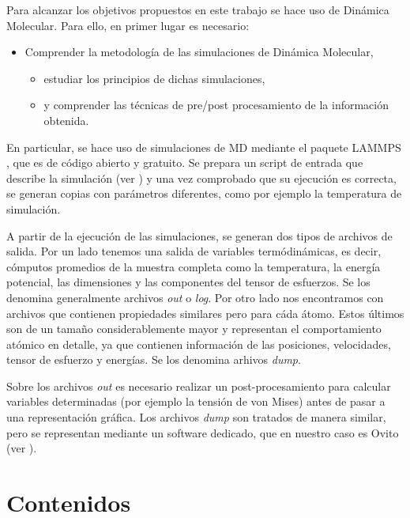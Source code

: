 Para alcanzar los objetivos propuestos en este trabajo se hace uso de Dinámica Molecular. Para ello, en primer lugar es necesario:

\begin{itemize}
 \item Comprender la metodología de las simulaciones de Dinámica Molecular,
 \begin{itemize}
  \item estudiar los principios de dichas simulaciones,
  \item y comprender las técnicas de pre/post procesamiento de la información obtenida.
 \end{itemize}
\end{itemize}

En particular, se hace uso de simulaciones de MD mediante el paquete LAMMPS \citep{plimpton95}, que es de código abierto y gratuito. Se prepara un script de entrada que describe la simulación (ver ) y una vez comprobado que su ejecución es correcta, se generan copias con parámetros diferentes, como por ejemplo la temperatura de simulación.

A partir de la ejecución de las simulaciones, se generan dos tipos de archivos de salida. Por un lado tenemos una salida de variables termódinámicas, es decir, cómputos promedios de la muestra completa como la temperatura, la energía potencial, las dimensiones y las componentes del tensor de esfuerzos. Se los denomina generalmente archivos \textit{out} o \textit{log}. Por otro lado nos encontramos con archivos que contienen propiedades similares pero para cáda átomo. Estos últimos son de un tamaño considerablemente mayor y representan el comportamiento atómico en detalle, ya que contienen información de las posiciones, velocidades, tensor de esfuerzo y energías. Se los denomina arhivos \textit{dump}.

Sobre los archivos \textit{out} es necesario realizar un post-procesamiento para calcular variables determinadas (por ejemplo la tensión de von Mises) antes de pasar a una representación gráfica. Los archivos \textit{dump} son tratados de manera similar, pero se representan mediante un  software dedicado, que en nuestro caso es Ovito \citep{stukowski10} (ver ).


\section{Contenidos}
\label{S1_6}

